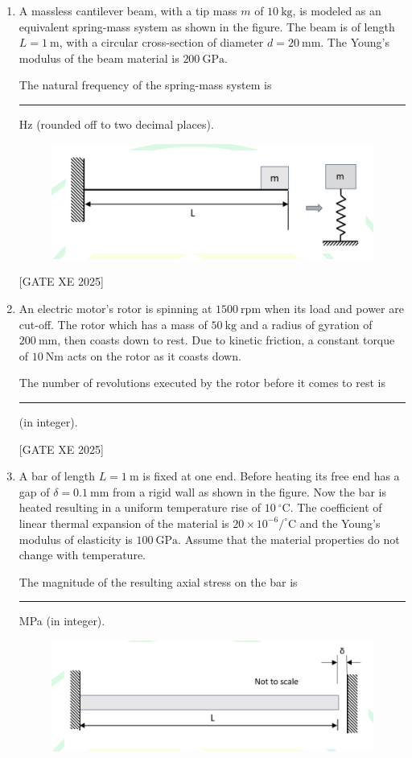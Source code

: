 \documentclass[journal,12pt,onecolumn]{IEEEtran}
\theoremstyle{remark}
\begin{document}
\begin{enumerate}
\hfill[GATE XE 2025]


\item A massless cantilever beam, with a tip mass $m$ of $10~\text{kg}$, is modeled as an equivalent spring-mass system as shown in the figure. The beam is of length $L=1~\text{m}$, with a circular cross-section of diameter $d=20~\text{mm}$. The Young’s modulus of the beam material is $200~\text{GPa}$.

The natural frequency of the spring-mass system is \rule{3cm}{0.15mm} Hz (rounded off to two decimal places).

\begin{figure}[H]
    \centering
    \includegraphics[width=0.5\columnwidth]{figs/fig27.png}
    \caption{}
    \label{fig:placeholder}
\end{figure}

\hfill[GATE XE 2025]


\item An electric motor’s rotor is spinning at $1500~\text{rpm}$ when its load and power are cut-off. The rotor which has a mass of $50~\text{kg}$ and a radius of gyration of $200~\text{mm}$, then coasts down to rest. Due to kinetic friction, a constant torque of $10~\text{Nm}$ acts on the rotor as it coasts down.

The number of revolutions executed by the rotor before it comes to rest is \rule{3cm}{0.15mm} (in integer).


\hfill[GATE XE 2025]


\item A bar of length $L=1~\text{m}$ is fixed at one end. Before heating its free end has a gap of $\delta=0.1~\text{mm}$ from a rigid wall as shown in the figure. Now the bar is heated resulting in a uniform temperature rise of $10~^\circ\text{C}$. The coefficient of linear thermal expansion of the material is $20\times10^{-6}/^\circ\text{C}$ and the Young’s modulus of elasticity is $100~\text{GPa}$. Assume that the material properties do not change with temperature.

The magnitude of the resulting axial stress on the bar is \rule{3cm}{0.15mm} MPa (in integer).
\begin{figure}[H]
    \centering
    \includegraphics[width=0.5\columnwidth]{figs/fig28.png}
    \caption{}
    \label{fig:placeholder}
\end{figure}


\end{enumerate}
\end{document}
